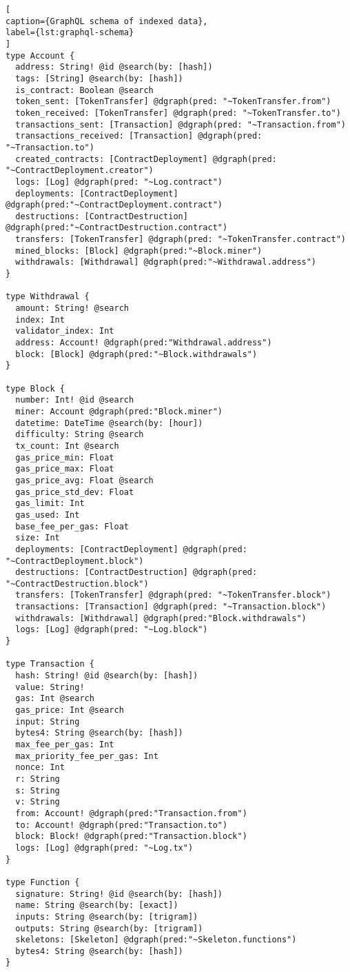 \begin{lstlisting}[
caption={GraphQL schema of indexed data},
label={lst:graphql-schema}
]
type Account {
  address: String! @id @search(by: [hash])
  tags: [String] @search(by: [hash])
  is_contract: Boolean @search
  token_sent: [TokenTransfer] @dgraph(pred: "~TokenTransfer.from")
  token_received: [TokenTransfer] @dgraph(pred: "~TokenTransfer.to")
  transactions_sent: [Transaction] @dgraph(pred: "~Transaction.from")
  transactions_received: [Transaction] @dgraph(pred: "~Transaction.to")
  created_contracts: [ContractDeployment] @dgraph(pred: "~ContractDeployment.creator")
  logs: [Log] @dgraph(pred: "~Log.contract")
  deployments: [ContractDeployment] @dgraph(pred:"~ContractDeployment.contract")
  destructions: [ContractDestruction] @dgraph(pred:"~ContractDestruction.contract")
  transfers: [TokenTransfer] @dgraph(pred: "~TokenTransfer.contract")
  mined_blocks: [Block] @dgraph(pred:"~Block.miner")
  withdrawals: [Withdrawal] @dgraph(pred:"~Withdrawal.address")
}

type Withdrawal {
  amount: String! @search
  index: Int
  validator_index: Int
  address: Account! @dgraph(pred:"Withdrawal.address")
  block: [Block] @dgraph(pred:"~Block.withdrawals")
}

type Block {
  number: Int! @id @search
  miner: Account @dgraph(pred:"Block.miner")
  datetime: DateTime @search(by: [hour])
  difficulty: String @search
  tx_count: Int @search
  gas_price_min: Float
  gas_price_max: Float
  gas_price_avg: Float @search
  gas_price_std_dev: Float
  gas_limit: Int
  gas_used: Int
  base_fee_per_gas: Float
  size: Int
  deployments: [ContractDeployment] @dgraph(pred: "~ContractDeployment.block")
  destructions: [ContractDestruction] @dgraph(pred: "~ContractDestruction.block")
  transfers: [TokenTransfer] @dgraph(pred: "~TokenTransfer.block")
  transactions: [Transaction] @dgraph(pred: "~Transaction.block")
  withdrawals: [Withdrawal] @dgraph(pred:"Block.withdrawals")
  logs: [Log] @dgraph(pred: "~Log.block")
}

type Transaction {
  hash: String! @id @search(by: [hash])
  value: String! 
  gas: Int @search
  gas_price: Int @search
  input: String
  bytes4: String @search(by: [hash])
  max_fee_per_gas: Int
  max_priority_fee_per_gas: Int
  nonce: Int
  r: String
  s: String
  v: String
  from: Account! @dgraph(pred:"Transaction.from")
  to: Account! @dgraph(pred:"Transaction.to")
  block: Block! @dgraph(pred:"Transaction.block")
  logs: [Log] @dgraph(pred: "~Log.tx")
}

type Function {
  signature: String! @id @search(by: [hash])
  name: String @search(by: [exact])
  inputs: String @search(by: [trigram])
  outputs: String @search(by: [trigram])
  skeletons: [Skeleton] @dgraph(pred:"~Skeleton.functions")
  bytes4: String @search(by: [hash])
}


\end{lstlisting}
